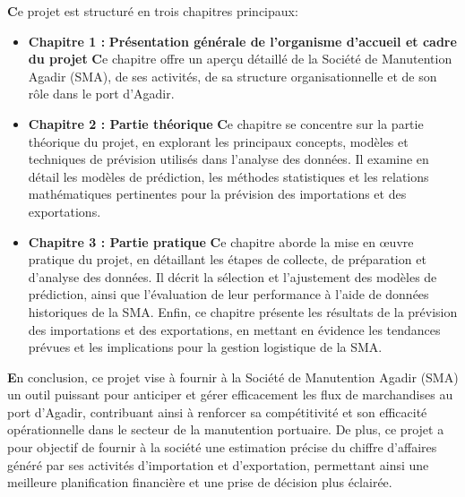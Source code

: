 \documentclass[11pt]{article}
\begin{document}
\textbf{C}e projet est structuré en trois chapitres principaux:\vspace{0.5cm}
\begin{itemize}
    \item \textbf{Chapitre 1 :}\textbf{ Présentation générale de l'organisme d'accueil et cadre du projet}\newline
     \textbf{C}e chapitre offre un aperçu détaillé de la Société de Manutention Agadir (SMA), de ses activités, de sa structure organisationnelle et de son rôle dans le port d'Agadir.\vspace{0.5cm}

     

      \item \textbf{Chapitre 2 : Partie théorique}\newline
         \textbf{C}e chapitre se concentre sur la partie théorique du projet, en explorant les principaux concepts, modèles et techniques de prévision utilisés dans l'analyse des données. Il examine en détail les modèles de prédiction, les méthodes statistiques et les relations mathématiques pertinentes pour la prévision des importations et des exportations.\vspace{0.5cm}

       \item \textbf{Chapitre 3 : Partie pratique}\newline
        \textbf{C}e chapitre aborde la mise en œuvre pratique du projet, en détaillant les étapes de collecte, de préparation et d'analyse des données. Il décrit la sélection et l'ajustement des modèles de prédiction, ainsi que l'évaluation de leur performance à l'aide de données historiques de la SMA. Enfin, ce chapitre présente les résultats de la prévision des importations et des exportations, en mettant en évidence les tendances prévues et les implications pour la gestion logistique de la SMA.\vspace{0.5cm}
        
\end{itemize}

\textbf{E}n conclusion, ce projet vise à fournir à la Société de Manutention Agadir (SMA) un outil puissant pour anticiper et gérer efficacement les flux de marchandises au port d'Agadir, contribuant ainsi à renforcer sa compétitivité et son efficacité opérationnelle dans le secteur de la manutention portuaire. De plus, ce projet a pour objectif de fournir à la société une estimation précise du chiffre d'affaires généré par ses activités d'importation et d'exportation, permettant ainsi une meilleure planification financière et une prise de décision plus éclairée. 
\end{document}
